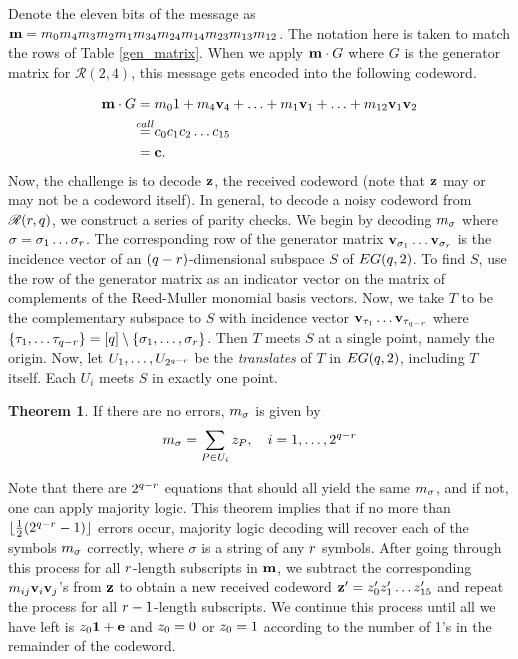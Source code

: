 \documentclass[12pt,twoside]{reedthesis}
\theoremstyle{definition}
\newtheorem{theorem}{Theorem}[chapter]
\begin{document}
Denote the eleven bits of the message as $\mathbf{m} = m_{0}m_{4}m_{3}m_{2}m_{1}m_{34}m_{24}m_{14}m_{23}m_{13}m_{12}$. The notation here is taken to match the rows of Table \ref{gen_matrix}. When we apply $\mathbf{m} \cdot G$ where $G$ is the generator matrix for $\mathscr{R}(2,4)$, this message gets encoded into the following codeword.

\begin{align*}
\mess\cdot G 
&= \m01 + \m4\bv4 + \ldots + \m1\bv1 + \ldots + \m{12}\bv1\bv2 \\
& \stackrel{\mathclap{call}}{=} \cwb0\cwb1\cwb2\ldots \cwb{15} \\
& = \cw.
\end{align*}
Now, the challenge is to decode $\mathbf{z}$, the received codeword (note that $\mathbf{z}$ may or may not be a codeword itself). In general, to decode a noisy codeword from $\mathscr{R}(r,q)$, we construct a series of parity checks. We begin by decoding $m_{\sigma}$ where $\sigma = \sigma_1 \ldots \sigma_r$. The corresponding row of the generator matrix $\mathbf{v}_{\sigma_1} \ldots \mathbf{v}_{\sigma_r}$ is the incidence vector of an $(q-r)$-dimensional subspace $S$ of $EG(q,2)$. To find $S$, use the row of the generator matrix as an indicator vector on the matrix of complements of the Reed-Muller monomial basis vectors. Now, we take $T$ to be the complementary subspace to $S$ with incidence vector $\mathbf{v}_{\tau_1}\ldots \mathbf{v}_{\tau_{q-r}}$ where $\{\tau_1, \ldots \tau_{q-r}\} = [q]\setminus \{\sigma_1, \ldots, \sigma_r\}$. Then $T$ meets $S$ at a single point, namely the origin. Now, let $U_1, \ldots, U_{2^{q-r}}$ be the \textit{translates} of $T$ in $EG(q,2)$, including $T$ itself. Each $U_i$ meets $S$ in exactly one point.

\begin{theorem} \label{error_correct_thm}
If there are no errors, $m_{\sigma}$ is given by
\begin{equation*}
m_{\sigma} = \sum_{P \in U_i} z_{P}, \quad i = 1, \ldots, 2^{q-r}
\end{equation*}
\end{theorem}
Note that there are $2^{q-r}$ equations that should all yield the same $m_{\sigma}$, and if not, one can apply majority logic. This theorem implies that if no more than $\lfloor\frac{1}{2}(2^{q-r} -1)\rfloor$ errors occur, majority logic decoding will recover each of the symbols $m_{\sigma}$ correctly, where $\sigma$ is a string of any $r$ symbols. 
	After going through this process for all $r$-length subscripts in $\mathbf{m}$, we subtract the corresponding $m_{ij}\mathbf{v}_{i}\mathbf{v}_{j}$'s from $\mathbf{z}$ to obtain a new received codeword $\mathbf{z}' = z_{0}'z_{1}' \ldots z_{15}'$ and repeat the process for all $r-1$-length subscripts. We continue this process until all we have left is $z_{0}\mathbf{1} + \mathbf{e}$ and $z_{0} = 0$ or $z_{0} =1$ according to the number of 1's in the remainder of the codeword.
	
\end{document}
